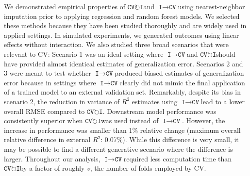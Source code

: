 \documentclass[AMA,STIX1COL,doublespace]{WileyNJD-v2}
\begin{document}
We demonstrated empirical properties of
$\texttt{CV}\!\circlearrowright\!\texttt{I}$\space and
$\texttt{I}\!\!\rightarrow\!\texttt{CV}$\space using nearest-neighbor
imputation prior to applying regression and random forest models. We
selected these methods because they have been studied thoroughly and are
widely used in applied settings. In simulated experiments, we generated
outcomes using linear effects without interaction. We also studied three
broad scenarios that were relevant to CV: Scenario 1 was an ideal
setting where $\texttt{I}\!\!\rightarrow\!\texttt{CV}$\space and
$\texttt{CV}\!\circlearrowright\!\texttt{I}$\space should have provided
almost identical estimates of generalization error. Scenarios 2 and 3
were meant to test whether
$\texttt{I}\!\!\rightarrow\!\texttt{CV}$\space produced biased estimates
of generalization error because in settings where
$\texttt{I}\!\!\rightarrow\!\texttt{CV}$\space clearly did not mimic the
final application of a trained model to an external validation set.
Remarkably, despite its bias in scenario 2, the reduction in variance of
\(R^2\) estimates using
$\texttt{I}\!\!\rightarrow\!\texttt{CV}$\space lead to a lower overall
RMSE compared to $\texttt{CV}\!\circlearrowright\!\texttt{I}$.
Downstream model performance was consistently superior when
$\texttt{CV}\!\circlearrowright\!\texttt{I}$\space was used instead of
$\texttt{I}\!\!\rightarrow\!\texttt{CV}$. However, the increase in
performance was smaller than 1\% relative change (maximum overall
relative difference in external \(R^2\): 0.07\%). While this difference
is very small, it may be possible to find a different generative
scenario where the difference is larger. Throughout our analysis,
$\texttt{I}\!\!\rightarrow\!\texttt{CV}$\space required less computation
time than $\texttt{CV}\!\circlearrowright\!\texttt{I}$\space by a factor
of roughly \(v\), the number of folds employed by CV.
\end{document}
